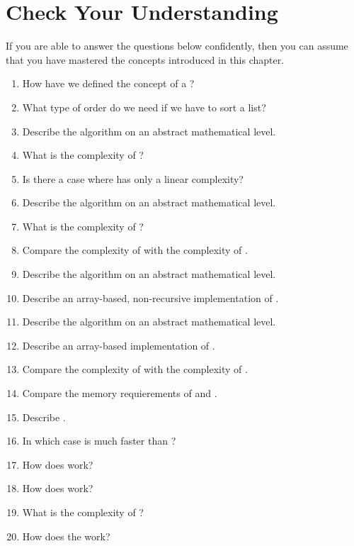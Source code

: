 \section{Check Your Understanding}
If you are able to answer the questions below confidently, then you can assume that you have mastered the concepts
introduced in this chapter.
\begin{enumerate}
\item How have we defined the concept of a ?
\item What type of order do we need if we have to sort a list?
\item Describe the algorithm  on an abstract mathematical level.
\item What is the complexity of ?
\item Is there a case where   has only a linear complexity?
\item Describe the algorithm  on an abstract mathematical level.
\item What is the complexity of ?
\item Compare the complexity of  with the complexity of .
\item Describe the algorithm  on an abstract mathematical level.
\item Describe an array-based, non-recursive implementation of .
\item Describe the algorithm  on an abstract mathematical level.
\item Describe an array-based implementation of .
\item Compare the complexity of  with the complexity of .
\item Compare the memory requierements of  and .
\item Describe .
\item In which case is  much faster than ?
\item How does  work?
\item How does  work?
\item What is the complexity of ?
\item How does the  work?
\end{enumerate}

